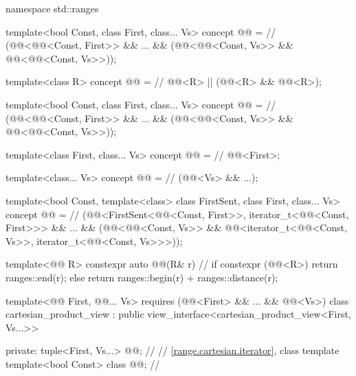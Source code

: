 \begin{codeblock}
namespace std::ranges {
  template<bool Const, class First, class... Vs>
  concept @@ =          // \expos
    (@@<@@<Const, First>> && ... &&
      (@@<@@<Const, Vs>>
        && @@<@@<Const, Vs>>));

  template<class R>
  concept @@ =                // \expos
    @@<R> || (@@<R> && @@<R>);

  template<bool Const, class First, class... Vs>
  concept @@ =          // \expos
    (@@<@@<Const, First>> && ... &&
      (@@<@@<Const, Vs>>
        && @@<@@<Const, Vs>>));

  template<class First, class... Vs>
  concept @@ =                 // \expos
    @@<First>;

  template<class... Vs>
  concept @@ =                  // \expos
    (@@<Vs> && ...);

  template<bool Const, template<class> class FirstSent, class First, class... Vs>
    concept @@ =               // \expos
      (@@<FirstSent<@@<Const, First>>,
          iterator_t<@@<Const, First>>> && ...
        && (@@<@@<Const, Vs>>
          && @@<iterator_t<@@<Const, Vs>>,
              iterator_t<@@<Const, Vs>>>));

  template<@@ R>
  constexpr auto @@(R& r) {       // \expos
    if constexpr (@@<R>) {
      return ranges::end(r);
    } else {
      return ranges::begin(r) + ranges::distance(r);
    }
  }

  template<@@ First, @@... Vs>
    requires (@@<First> && ... && @@<Vs>)
  class cartesian_product_view : public view_interface<cartesian_product_view<First, Vs...>> {
  private:
    tuple<First, Vs...> @@;                 // \expos
    // \ref{range.cartesian.iterator}, class template 
    template<bool Const> class @@;       // \expos

}}
\end{codeblock}
